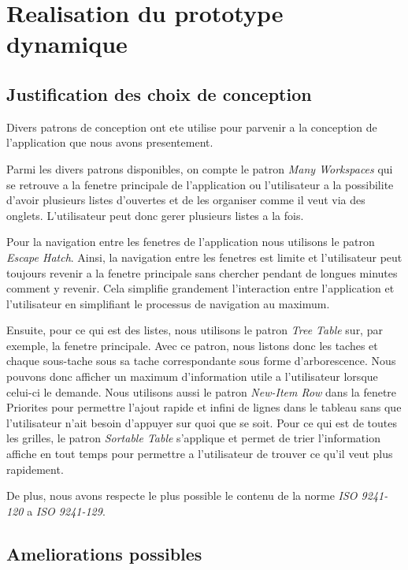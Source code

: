 \documentclass[letterpaper, oneside, 12pt, these, creativecommons]{thETS}
\begin{document}
\chapter{Realisation du prototype dynamique}

\section{Justification des choix de conception}

Divers patrons de conception ont ete utilise pour parvenir a la conception de l'application que nous avons presentement. 

Parmi les divers patrons disponibles, on compte le patron \emph{Many Workspaces} qui se retrouve a la fenetre principale de l'application ou l'utilisateur a la possibilite d'avoir plusieurs listes d'ouvertes et de les organiser comme il veut via des onglets. L'utilisateur peut donc gerer plusieurs listes a la fois. 

Pour la navigation entre les fenetres de l'application nous utilisons le patron \emph{Escape Hatch}. Ainsi, la navigation entre les fenetres est limite et l'utilisateur peut toujours revenir a la fenetre principale sans chercher pendant de longues minutes comment y revenir. Cela simplifie grandement l'interaction entre l'application et l'utilisateur en simplifiant le processus de navigation au maximum. 

Ensuite, pour ce qui est des listes, nous utilisons le patron \emph{Tree Table} sur, par exemple, la fenetre principale. Avec ce patron, nous listons donc les taches et chaque sous-tache sous sa tache correspondante sous forme d'arborescence. Nous pouvons donc afficher un maximum d'information utile a l'utilisateur lorsque celui-ci le demande. Nous utilisons aussi le patron \emph{New-Item Row} dans la fenetre Priorites pour permettre l'ajout rapide et infini de lignes dans le tableau sans que l'utilisateur n'ait besoin d'appuyer sur quoi que se soit. Pour ce qui est de toutes les grilles, le patron \emph{Sortable Table} s'applique et permet de trier l'information affiche en tout temps pour permettre a l'utilisateur de trouver ce qu'il veut plus rapidement. 

De plus, nous avons respecte le plus possible le contenu de la norme \emph{ISO 9241-120} a \emph{ISO 9241-129}.

\section{Ameliorations possibles}
\end{document}
